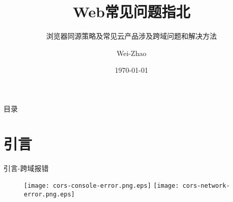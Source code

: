 \documentclass[aspectratio=169,xcolor=dvipsnames,UTF8]{beamer}
\title[Web常见问题指北]{Web常见问题指北}
\subtitle{浏览器同源策略及常见云产品涉及跨域问题和解决方法}
\author[Wei-Zhao] {Wei-Zhao}
\institute[Anchnet] 
{
	Anchen.Net
}
\date{\today}
\begin{document}
	
	\begin{frame}
		\titlepage
	\end{frame}
	
	
	\begin{frame}{目录}
		\tableofcontents
	\end{frame}
	
	
	\section{引言}
	\begin{frame}{引言-跨域报错}
		\begin{figure}
			\texttt{[image: cors-console-error.png.eps]}
			\texttt{[image: cors-network-error.png.eps]}
		\end{figure}
	\end{frame}
	
\end{document}
